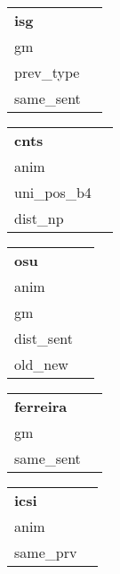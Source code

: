 \begin{table}[htbp]
\parbox[t]{.15\linewidth}{
		\centering
		\begin{tabular}{|l|l}
			\cline{1-1}
			\textbf{isg}       &  \\ \cline{1-1}
			gm        &  \\ \cline{1-1}
			prev\_type         &  \\ \cline{1-1}
			same\_sent &  \\ \cline{1-1}
		
		\end{tabular}
		
	}
\parbox{.15\linewidth}{
		\centering
		\begin{tabular}{|l|l}
			\cline{1-1}
			\textbf{cnts}        &  \\ \cline{1-1}
			anim         &  \\ \cline{1-1}
			uni\_pos\_b4         &  \\ \cline{1-1}
			dist\_np         &  \\ \cline{1-1}
		\end{tabular}

	}
\parbox{.15\linewidth}{
		\centering
		\begin{tabular}{|l|l}
			\cline{1-1}
			\textbf{osu}        &  \\ \cline{1-1}
			anim         &  \\ \cline{1-1}
			gm         &  \\ \cline{1-1}
			dist\_sent &  \\ \cline{1-1}
			old\_new       &  \\ \cline{1-1}
		\end{tabular}
		

	}
\parbox{.15\linewidth}{
		\centering
		\begin{tabular}{|l|l}
			\cline{1-1}
			\textbf{ferreira}        &  \\ \cline{1-1}
			gm         &  \\ \cline{1-1}
			same\_sent         &  \\ \cline{1-1}
		\end{tabular}
		\newline
            \vspace*{0.2 cm}
        \newline
		\begin{tabular}{|l|l}
			\cline{1-1}
			\textbf{icsi}        &  \\ \cline{1-1}
			anim         &  \\ \cline{1-1}
			same\_prv         &  \\ \cline{1-1}
			

\end{tabular}}
\end{table}
